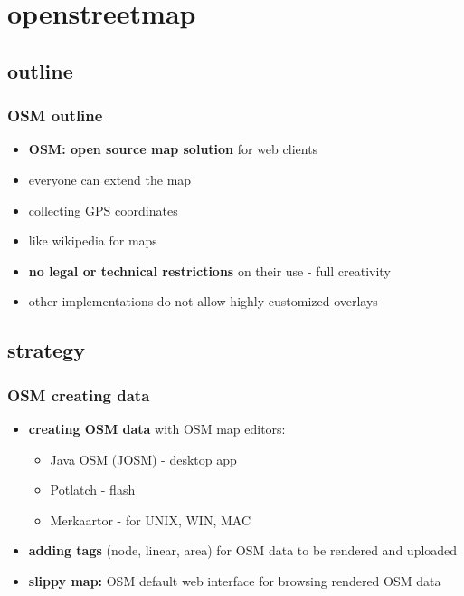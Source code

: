 \documentclass[blue]{beamer}
\begin{document}

\section{openstreetmap}
\subsection{outline}
\frame
{
\frametitle{\textbf{OSM outline}}
\begin{itemize}
	\item \textbf{OSM: open source map solution} for web clients
	\item everyone can extend the map
	\item collecting GPS coordinates
	\item like wikipedia for maps
	\item \textbf{no legal or technical restrictions} on their use - full creativity
	\item other implementations do not allow highly customized overlays
\end{itemize}
}

\subsection{strategy}
\frame
{
\frametitle{\textbf{OSM creating data}}
\begin{itemize}
	\item \textbf{creating OSM data} with OSM map editors:
	\begin{itemize}
			\item Java OSM (JOSM) - desktop app
			\item Potlatch - flash
			\item Merkaartor - for UNIX, WIN, MAC
	\end{itemize}
	\item \textbf{adding tags} (node, linear, area) for OSM data to be rendered and uploaded
	\item \textbf{slippy map:} OSM default web interface for browsing rendered OSM data
\end{itemize}
}
\end{document}
